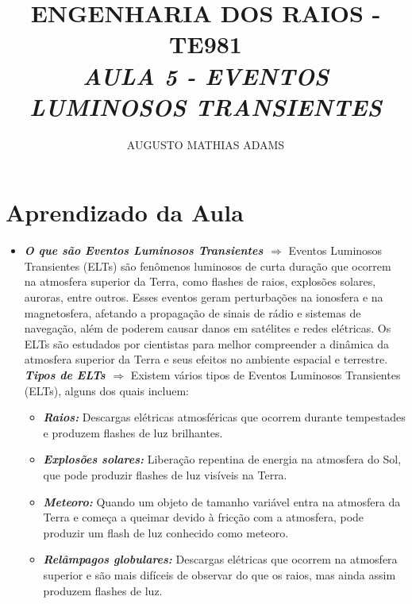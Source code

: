 \documentclass[a4paper, 12pt, onecolumn,singlespacing]{article}
\title{\normalsize{ENGENHARIA DOS RAIOS - TE981}\\ \huge{\textbf\textit{{AULA 5 - EVENTOS LUMINOSOS TRANSIENTES}}\\}}
\author{\small{AUGUSTO MATHIAS ADAMS}}
\begin{document}
	
	\maketitle
	
	\section{Aprendizado da Aula}
	
	\begin{itemize}
		\item \textbf{\textit{O que são Eventos Luminosos Transientes $\Rightarrow$ }}Eventos Luminosos Transientes (ELTs) são fenômenos luminosos de curta duração que ocorrem na atmosfera superior da Terra, como flashes de raios, explosões solares, auroras, entre outros. Esses eventos geram perturbações na ionosfera e na magnetosfera, afetando a propagação de sinais de rádio e sistemas de navegação, além de poderem causar danos em satélites e redes elétricas. Os ELTs são estudados por cientistas para melhor compreender a dinâmica da atmosfera superior da Terra e seus efeitos no ambiente espacial e terrestre.
		\subitem \textbf{\textit{Tipos de ELTs $\Rightarrow$ }}Existem vários tipos de Eventos Luminosos Transientes (ELTs), alguns dos quais incluem:
		\begin{itemize}
			\item \textbf{\textit{Raios:}} Descargas elétricas atmosféricas que ocorrem durante tempestades e produzem flashes de luz brilhantes.
			
			\item \textbf{\textit{Explosões solares:}} Liberação repentina de energia na atmosfera do Sol, que pode produzir flashes de luz visíveis na Terra.
			
			\item \textbf{\textit{Meteoro:}} Quando um objeto de tamanho variável entra na atmosfera da Terra e começa a queimar devido à fricção com a atmosfera, pode produzir um flash de luz conhecido como meteoro.
			
			\item \textbf{\textit{Relâmpagos globulares:}} Descargas elétricas que ocorrem na atmosfera superior e são mais difíceis de observar do que os raios, mas ainda assim produzem flashes de luz.
			

\end{itemize}
\end{itemize}
\end{document}
